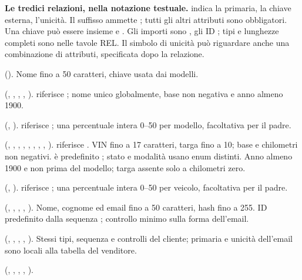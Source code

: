 \noindent\textbf{Le tredici relazioni, nella notazione testuale.}
 indica la primaria,  la chiave esterna,  l'unicità.
Il suffisso  ammette ; tutti gli altri attributi sono
obbligatori. Una chiave può essere insieme  e .
Gli importi sono , gli ID ; tipi e lunghezze
completi sono nelle tavole REL. Il simbolo di unicità può riguardare anche
una combinazione di attributi, specificata dopo la relazione.
\begin{description}[style=nextline,leftmargin=1em]
\item[\code{brand}]
().
Nome fino a 50 caratteri, chiave usata dai modelli.
\item[\code{model}]
(, , , , ).
 riferisce ; nome unico globalmente, base non negativa e anno almeno 1900.
\item[\code{model_discount}]
(, ).
 riferisce ; una percentuale intera 0--50 per modello, facoltativa per il padre.
\item[\code{vehicle}]
(, , , , , , , , ).
 riferisce . VIN fino a 17 caratteri, targa fino a 10; base e chilometri non negativi.  è predefinito ; stato e modalità usano enum distinti. Anno almeno 1900 e non prima del modello; targa assente solo a chilometri zero.
\item[\code{vehicle_discount}]
(, ).
 riferisce ; una percentuale intera 0--50 per veicolo, facoltativa per il padre.
\item[\code{client}]
(, , , , ).
Nome, cognome ed email fino a 50 caratteri, hash fino a 255. ID predefinito dalla sequenza ; controllo minimo sulla forma dell'email.
\item[\code{salesman}]
(, , , , ).
Stessi tipi, sequenza e controlli del cliente; primaria e unicità dell'email sono locali alla tabella del venditore.
\item[\code{manager}]
(, , , , ).

\end{description}
